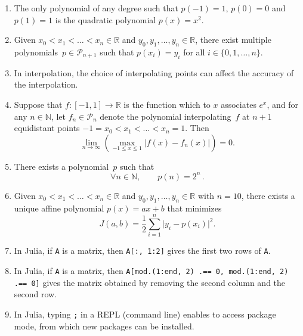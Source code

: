 \documentclass{article}
\newcommand{\julia}[1]{\texttt{#1}}
\begin{document}
\begin{enumerate}

    \item
        The only polynomial of any degree such that $p(-1) = 1$, $p(0) = 0$ and $p(1) = 1$ is the quadratic polynomial $p(x) = x^2$.

    \item
        Given $x_0 < x_1 < \dotsc < x_n \in \mathbb R$
        and $y_0, y_1, \dotsc , y_n \in \mathbb R$,
        there exist multiple polynomials~$p \in \mathcal P_{n+1}$ such that $p(x_i) = y_i$ for all $i \in \{0, 1, \dotsc, n\}$.

    \item
        In interpolation, the choice of interpolating points can affect the accuracy of the interpolation.

    \item
        Suppose that $f \colon [-1, 1] \to \mathbb R$ is the function which to $x$ associates $e^x$,
        and for any $n \in \mathbb N$,
        let $f_n \in \mathcal P_n$ denote the polynomial interpolating~$f$ at $n+1$ equidistant points $-1 = x_0 < x_1 < \dotsc < x_n = 1$.
        Then
        \[
            \lim_{n \to \infty} \left( \max_{-1 \leq x \leq 1} \bigl\lvert f(x) - f_n(x) \bigr\rvert \right) = 0.
        \]

    \item
        There exists a polynomial~$p$ such that
        \[
            \forall n \in \mathbb N, \qquad
            p(n) = 2^n \, .
        \]

    \item
        Given $x_0 < x_1 < \dotsc < x_n \in \mathbb R$
        and $y_0, y_1, \dotsc , y_n \in \mathbb R$ with $n = 10$,
        there exists a unique affine polynomial $p(x) = ax + b$ that minimizes
        \[
            J(a, b) = \frac{1}{2} \sum_{i=1}^n \bigl\lvert y_i - p(x_i) \bigr\rvert^2.
        \]

    \item
        In Julia, if \julia{A} is a matrix,
        then \julia{A[:, 1:2]} gives the first two rows of \julia{A}.

    \item
        In Julia, if \julia{A} is a matrix,
        then \julia{A[mod.(1:end, 2) .== 0, mod.(1:end, 2) .== 0]} gives the matrix obtained by removing the second column and the second row.

    \item
        In Julia, typing \julia{;} in a REPL (command line) enables to access package mode,
        from which new packages can be installed.


\end{enumerate}
\end{document}
